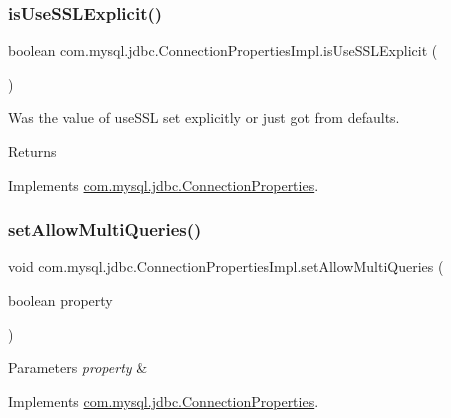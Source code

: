 \subsubsection{\texorpdfstring{is\+Use\+S\+S\+L\+Explicit()}{isUseSSLExplicit()}}
{\footnotesize\ttfamily boolean com.\+mysql.\+jdbc.\+Connection\+Properties\+Impl.\+is\+Use\+S\+S\+L\+Explicit (\begin{DoxyParamCaption}{ }\end{DoxyParamCaption})}

Was the value of use\+S\+SL set explicitly or just got from defaults.

\begin{DoxyReturn}{Returns}

\end{DoxyReturn}


Implements \mbox{\hyperlink{interfacecom_1_1mysql_1_1jdbc_1_1_connection_properties}{com.\+mysql.\+jdbc.\+Connection\+Properties}}.

\mbox{\label{classcom_1_1mysql_1_1jdbc_1_1_connection_properties_impl_aa805cde72f5aa791da69e67346678199}} 
\subsubsection{\texorpdfstring{set\+Allow\+Multi\+Queries()}{setAllowMultiQueries()}}
{\footnotesize\ttfamily void com.\+mysql.\+jdbc.\+Connection\+Properties\+Impl.\+set\+Allow\+Multi\+Queries (\begin{DoxyParamCaption}\item[{boolean}]{property }\end{DoxyParamCaption})}


\begin{DoxyParams}{Parameters}
{\em property} & \\
\hline
\end{DoxyParams}


Implements \mbox{\hyperlink{interfacecom_1_1mysql_1_1jdbc_1_1_connection_properties_ac1ed5c3bc5f7f6c977f499b6560ef5a4}{com.\+mysql.\+jdbc.\+Connection\+Properties}}.

